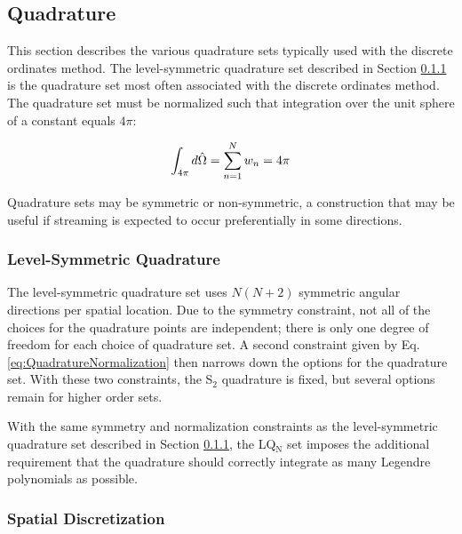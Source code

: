 \subsection{Quadrature}

This section describes the various quadrature sets typically used with the discrete ordinates method. The level-symmetric quadrature set described in Section \ref{sec:LevelSymmetric} is the quadrature set most often associated with the discrete ordinates method. The quadrature set must be normalized such that integration over the unit sphere of a constant equals \(4\pi\):

\begin{equation}
\label{eq:QuadratureNormalization}
\int_{4\pi}^{}d\hat{\Omega}  =\sum_{n=1}^{N} w_n =4\pi
\end{equation}

Quadrature sets may be symmetric or non-symmetric, a construction that may be useful if streaming is expected to occur preferentially in some directions.

\subsubsection{Level-Symmetric Quadrature}
\label{sec:LevelSymmetric}
The level-symmetric quadrature set uses \(N(N+2)\) symmetric angular directions per spatial location. Due to the symmetry constraint, not all of the choices for the quadrature points are independent; there is only one degree of freedom for each choice of quadrature set. A second constraint given by Eq. \eqref{eq:QuadratureNormalization} then narrows down the options for the quadrature set. With these two constraints, the S$_2$ quadrature is fixed, but several options remain for higher order sets. 


With the same symmetry and normalization constraints as the level-symmetric quadrature set described in Section \ref{sec:LevelSymmetric}, the LQ$_{\text{N}}$ set imposes the additional requirement that the quadrature should correctly integrate as many Legendre polynomials as possible. 

\subsubsection{Spatial Discretization}

